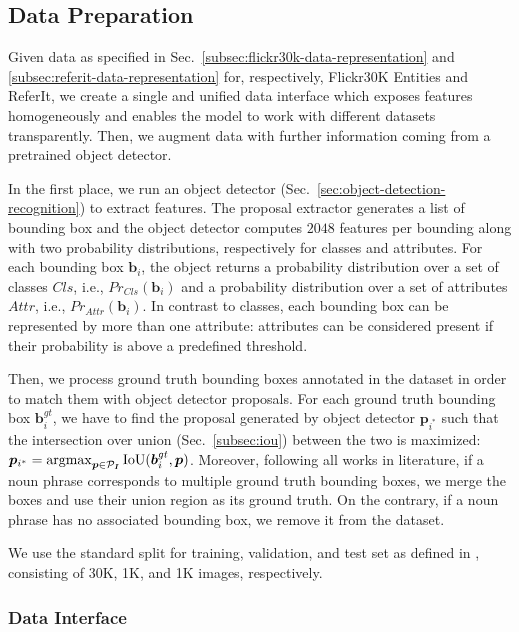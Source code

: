 \subsection{Data Preparation}
\label{subsec:data-preparation}

Given data as specified in
Sec.~\ref{subsec:flickr30k-data-representation} and
\ref{subsec:referit-data-representation} for, respectively, Flickr30K
Entities and ReferIt, we create a single and unified data interface
which exposes features homogeneously and enables the model to work
with different datasets transparently. Then, we augment data with
further information coming from a pretrained object detector.

In the first place, we run an object detector
(Sec.~\ref{sec:object-detection-recognition}) to extract features. The
proposal extractor generates a list of bounding box and the object
detector computes $2048$ features per bounding along with two
probability distributions, respectively for classes and attributes.
For each bounding box $\bm{b}_i$, the object returns a probability
distribution over a set of classes $Cls$, i.e., $Pr_{Cls}(\bm{b}_i)$
and a probability distribution over a set of attributes $Attr$, i.e.,
$Pr_{Attr}(\bm{b}_i)$. In contrast to classes, each bounding box can
be represented by more than one attribute: attributes can be
considered present if their probability is above a predefined
threshold.

Then, we process ground truth bounding boxes annotated in the dataset
in order to match them with object detector proposals. For each ground
truth bounding box $\bm{b}^{gt}_i$, we have to find the proposal
generated by object detector $\bm{p}_{i^*}$ such that the intersection
over union (Sec.~\ref{subsec:iou}) between the two is maximized:
$\bm{p}_{i^*} = \operatorname*{argmax}_{\bm{p} \in \mathcal{P}_{\bm{I}}}
\text{IoU}(\bm{b}^{gt}_i, \bm{p})$. Moreover, following all works in
literature, if a noun phrase corresponds to multiple ground truth
bounding boxes, we merge the boxes and use their union region as its
ground truth. On the contrary, if a noun phrase has no associated
bounding box, we remove it from the dataset.

We use the standard split for training, validation, and test set as
defined in  \cite{plummer2015flickr30k}, consisting of 30K, 1K,
and 1K images, respectively.

\subsubsection{Data Interface}
\label{subsec:data-interface}

